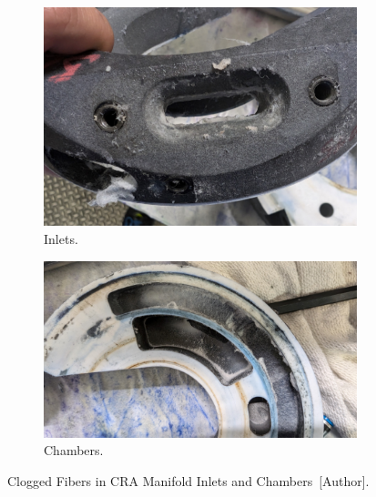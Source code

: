 \begin{figure}[H]
\centering
  \begin{subfigure}{0.45\textwidth}
  \centering
    \includegraphics[width=1\linewidth]{FIGURES/Fib1.png}
    \caption{Inlets.}
  \end{subfigure}
  \begin{subfigure}{0.45\textwidth}
  \centering
    \includegraphics[width=1.1\linewidth]{FIGURES/Fib2.png}
    \caption{Chambers.}
  \end{subfigure}
  \caption{Clogged Fibers in CRA Manifold Inlets and Chambers~[Author].}
    \label{fibers1}
\end{figure}


